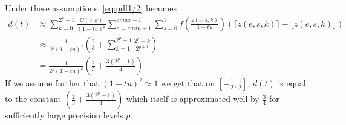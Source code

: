 \documentclass[10pt,a4paper]{article}
\theoremstyle{plain}
\theoremstyle{definition}
\newcommand{\ceil}[1]{\lceil #1 \rceil}
\newcommand{\floor}[1]{\lfloor #1 \rfloor}
\begin{document}
Under these assumptions, \eqref{eq:pdf1/2} becomes
\begin{align*}
d(t)&\approx\sum_{k=0}^{2^p-1}\frac{C(e,k)}{(1-tu)^2}\sum_{e=emin+1}^{emax-1}\sum_{s=0}^1 f\left(\frac{z(e,s,k)}{1-tu}\right)(\ceil{z(e,s,k)}-\floor{z(e,s,k)})\\
&\approx\frac{1}{2^p(1-tu)^2}\left(\frac{2}{3}+\sum_{k=1}^{2^p-1}\frac{2^p+k}{2^{p+1}}\right)\\
&=\frac{1}{2^p(1-tu)^2}\left(\frac{2}{3}+\frac{3(2^{p}-1)}{4}\right)
\end{align*}
If we assume further that $(1-tu)^2\approx 1$ we get that on $\left[-\frac{1}{2},\frac{1}{2}\right]$, $d(t)$ is equal to the constant $\left(\frac{2}{3}+\frac{3(2^{p}-1)}{4}\right)$ which itself is approximated well by $\frac{3}{4}$ for sufficiently large precision levels $p$.
\end{document}
